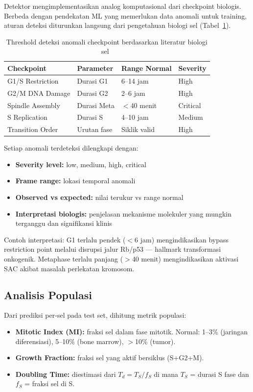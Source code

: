 \documentclass[conference]{IEEEtran}
\begin{document}
Detektor mengimplementasikan analog komputasional dari checkpoint biologis. Berbeda dengan pendekatan ML yang memerlukan data anomali untuk training, aturan deteksi diturunkan langsung dari pengetahuan biologi sel (Tabel~\ref{tab:thresholds}).

\begin{table}[!t]
\centering
\caption{Threshold deteksi anomali checkpoint berdasarkan literatur biologi sel~\cite{alberts2022,morgan2007}}
\label{tab:thresholds}
\footnotesize
\begin{tabular}{@{}llll@{}}
\toprule
\textbf{Checkpoint} & \textbf{Parameter} & \textbf{Range Normal} & \textbf{Severity} \\
\midrule
G1/S Restriction & Durasi G1 & 6--14 jam & High \\
G2/M DNA Damage & Durasi G2 & 2--6 jam & High \\
Spindle Assembly & Durasi Meta & $<$40 menit & Critical \\
S Replication & Durasi S & 4--10 jam & Medium \\
Transition Order & Urutan fase & Siklik valid & High \\
\bottomrule
\end{tabular}
\end{table}

Setiap anomali terdeteksi dilengkapi dengan:
\begin{itemize}[noitemsep,topsep=3pt]
    \item \textbf{Severity level:} low, medium, high, critical
    \item \textbf{Frame range:} lokasi temporal anomali
    \item \textbf{Observed vs expected:} nilai terukur vs range normal
    \item \textbf{Interpretasi biologis:} penjelasan mekanisme molekuler yang mungkin terganggu dan signifikansi klinis
\end{itemize}

Contoh interpretasi: G1 terlalu pendek ($<$6 jam) mengindikasikan bypass restriction point melalui disrupsi jalur Rb/p53 --- hallmark transformasi onkogenik. Metaphase terlalu panjang ($>$40 menit) mengindikasikan aktivasi SAC akibat masalah perlekatan kromosom.

\subsection{Analisis Populasi}

Dari prediksi per-sel pada test set, dihitung metrik populasi:
\begin{itemize}[noitemsep,topsep=3pt]
    \item \textbf{Mitotic Index (MI):} fraksi sel dalam fase mitotik. Normal: 1--3\% (jaringan diferensiasi), 5--10\% (bone marrow), $>$10\% (tumor).
    \item \textbf{Growth Fraction:} fraksi sel yang aktif bersiklus (S+G2+M).
    \item \textbf{Doubling Time:} diestimasi dari $T_d = T_S / f_S$ di mana $T_S$ = durasi S fase dan $f_S$ = fraksi sel di S.
\end{itemize}
\end{document}
